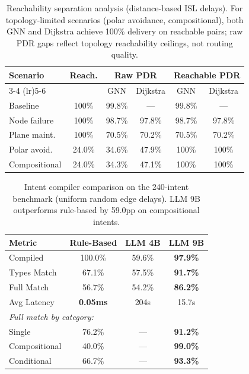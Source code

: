 \begin{table}[t]
\centering
\caption{Reachability separation analysis (distance-based ISL delays). For topology-limited scenarios (polar avoidance, compositional), both GNN and Dijkstra achieve 100\% delivery on reachable pairs; raw PDR gaps reflect topology reachability ceilings, not routing quality.}
\label{tab:reachability}
\begin{tabular}{lccccc}
\toprule
\textbf{Scenario} & \textbf{Reach.} & \multicolumn{2}{c}{\textbf{Raw PDR}} & \multicolumn{2}{c}{\textbf{Reachable PDR}} \\
\cmidrule(lr){3-4} \cmidrule(lr){5-6}
& & GNN & Dijkstra & GNN & Dijkstra \\
\midrule
Baseline          & 100\%  & 99.8\% & ---     & 99.8\% & ---     \\
Node failure      & 100\%  & 98.7\% & 97.8\%  & 98.7\% & 97.8\% \\
Plane maint.      & 100\%  & 70.5\% & 70.2\%  & 70.5\% & 70.2\% \\
Polar avoid.      & 24.0\% & 34.6\% & 47.9\%  & 100\%  & 100\%  \\
Compositional     & 24.0\% & 34.3\% & 47.1\%  & 100\%  & 100\%  \\
\bottomrule
\end{tabular}
\end{table}

\begin{table}[t]
\centering
\caption{Intent compiler comparison on the 240-intent benchmark
(uniform random edge delays). LLM 9B outperforms rule-based by 59.0pp on compositional intents.}
\label{tab:compiler_comparison}
\begin{tabular}{lccc}
\toprule
\textbf{Metric} & \textbf{Rule-Based} & \textbf{LLM 4B} & \textbf{LLM 9B} \\
\midrule
Compiled          & 100.0\% & 59.6\% & \textbf{97.9\%} \\
Types Match       & 67.1\%  & 57.5\% & \textbf{91.7\%} \\
Full Match        & 56.7\%  & 54.2\% & \textbf{86.2\%} \\
Avg Latency       & \textbf{0.05ms} & 204s & 15.7s \\
\midrule
\multicolumn{4}{l}{\textit{Full match by category:}} \\
\quad Single      & 76.2\%  & ---    & \textbf{91.2\%} \\
\quad Compositional & 40.0\% & ---   & \textbf{99.0\%} \\
\quad Conditional & 66.7\%  & ---    & \textbf{93.3\%} \\
\bottomrule
\end{tabular}
\end{table}

